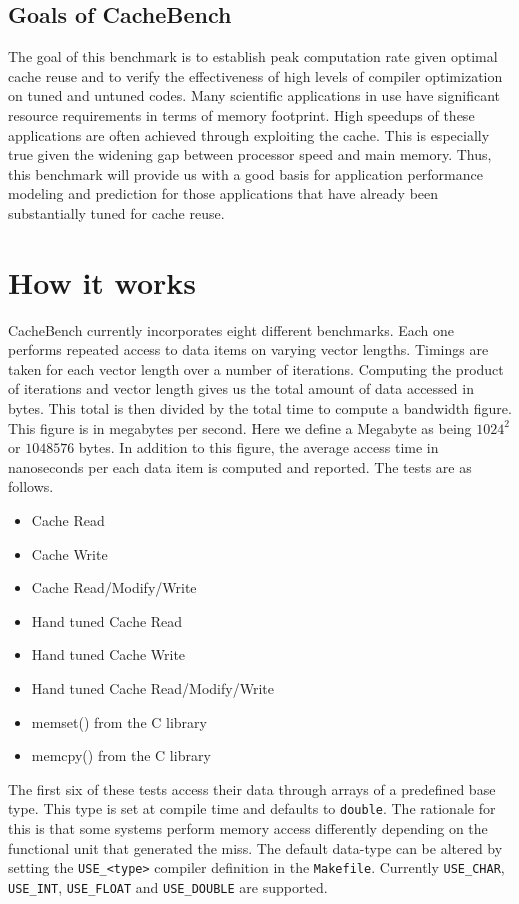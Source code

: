 \documentclass [12pt]{article}
\begin{document}
\subsection{Goals of CacheBench}

The goal of this benchmark is to establish peak computation rate given
optimal cache reuse and to verify the effectiveness of high levels of
compiler optimization on tuned and untuned codes.  Many scientific
applications in use have significant resource requirements in terms of
memory footprint. High speedups of these applications are often
achieved through exploiting the cache. This is especially true given
the widening gap between processor speed and main memory. Thus, this
benchmark will provide us with a good basis for application
performance modeling and prediction for those applications that have
already been substantially tuned for cache reuse.

\section{How it works}

CacheBench currently incorporates eight different benchmarks. Each one
 performs repeated access to data items on varying vector
lengths. Timings are taken for each vector length over a number of
iterations. Computing the product of iterations and vector length
gives us the total amount of data accessed in bytes. This total is
then divided by the total time to compute a bandwidth figure. This
figure is in megabytes per second. Here we define a Megabyte as being
$1024^{2}$ or $1048576$ bytes. In addition to this figure, the average
access time in nanoseconds per each data item is computed and reported. 
The tests are as follows.

\begin{itemize}
\item Cache Read
\item Cache Write
\item Cache Read/Modify/Write
\item Hand tuned Cache Read
\item Hand tuned Cache Write
\item Hand tuned Cache Read/Modify/Write
\item memset() from the C library
\item memcpy() from the C library
\end{itemize}

The first six of these tests access their data through arrays of a
predefined base type. This type is set at compile time and defaults to
{\tt double}. The rationale for this is that some systems perform memory
access differently depending on the functional unit that generated the
miss. The default data-type can be altered by setting the {\tt USE\_<type>}
compiler definition in the {\tt Makefile}. Currently {\tt USE\_CHAR}, 
{\tt USE\_INT}, {\tt USE\_FLOAT} and {\tt USE\_DOUBLE} are supported.
\end{document}
